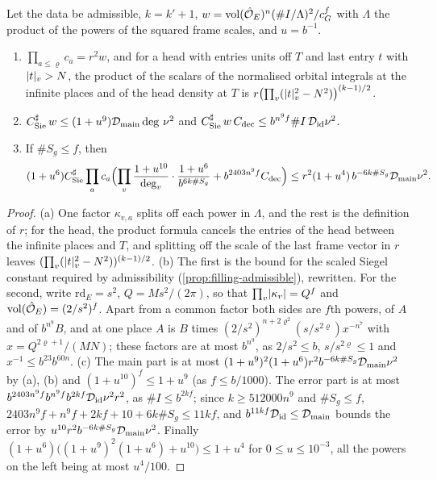 \begin{lemma}\label{lem:main-constants}
Let the data be admissible, $k=k'+1$, $w=\operatorname{vol}(\hat{\mathcal{O}}_E)^n(\#I/\Lambda)^2/c_G^f$ with $\Lambda$ the product of the powers of the squared frame scales, and $u=b^{-1}$.
\begin{enumerate}[label=\textup{(\alph*)}]
\item $\prod_{a\le\varrho}c_a=r^2w$, and for a head with entries units off $T$ and last entry $t$ with $\lvert t\rvert_v>N$, the product of the scalars of the normalised orbital integrals at the infinite places and of the head
density at $T$ is $r\bigl(\prod_v(\lvert t\rvert_v^2-N^2)\bigr)^{(k-1)/2}$.
\item $C^\sharp_{\rm Sie}\,w\le(1+u^9)\mathcal D_{\rm main}\deg\,\nu^2$ and $C^\sharp_{\rm Sie}\,w\,C_{\rm dec}\le b^{n^9f}\#I\,\mathcal D_{\rm id}\nu^2$.
\item If $\#S_g\le f$, then
\[
  (1+u^6)C^\sharp_{\rm Sie}\prod_ac_a\Bigl(\prod_v\frac{1+u^{10}}{\deg_v}\cdot\frac{1+u^6}{b^{6k\#S_g}}+b^{2403n^9f}C_{\rm dec}\Bigr)\le r^2(1+u^4)\,b^{-6k\#S_g}\mathcal D_{\rm main}\nu^2.
\]
\end{enumerate}
\end{lemma}

\begin{proof}
(a) One factor $\kappa_{v,a}$ splits off each power in $\Lambda$, and the rest is the definition of $r$; for the head, the product formula cancels the entries of the head between the infinite places and $T$, and splitting off the
scale of the last frame vector in $r$ leaves $(\prod_v(\lvert t\rvert_v^2-N^2))^{(k-1)/2}$. (b) The first is the bound for the scaled Siegel constant required by admissibility (\cref{prop:filling-admissible}), rewritten. For the second,
write $\mathrm{rd}_E=s^2$, $Q=Ms^2/(2\pi)$, so that $\prod_v\lvert \kappa_v\rvert=Q^f$ and $\operatorname{vol}(\hat{\mathcal{O}}_E)=(2/s^2)^f$. Apart from a common factor both sides are $f$th powers, of $A$ and of $b^{n^9}B$, and at one place $A$ is $B$ times
$(2/s^2)^{n+2\varrho^2}(s/s^{2\varrho})x^{-n^7}$ with $x=Q^{2\varrho+1}/(MN)$; these factors are at most $b^{n^9}$, as $2/s^2\le b$, $s/s^{2\varrho}\le1$ and $x^{-1}\le b^{23}b^{60n}$.
(c) The main part is at most $(1+u^9)^2(1+u^6)r^2b^{-6k\#S_g}\mathcal D_{\rm main}\nu^2$ by (a), (b) and $(1+u^{10})^f\le1+u^9$ (as $f\le b/1000$). The error part is at most $b^{2403n^9f}b^{n^9f}b^{2kf}\mathcal D_{\rm id}\nu^2r^2$, as $\#I\le b^{2kf}$;
since $k\ge512000n^9$ and $\#S_g\le f$, $2403n^9f+n^9f+2kf+10+6k\#S_g\le11kf$, and $b^{11kf}\mathcal D_{\rm id}\le\mathcal D_{\rm main}$ bounds the error by $u^{10}r^2b^{-6k\#S_g}\mathcal D_{\rm main}\nu^2$. Finally
$(1+u^6)\bigl((1+u^9)^2(1+u^6)+u^{10}\bigr)\le1+u^4$ for $0\le u\le10^{-3}$, all the powers on the left being at most $u^4/100$.
\end{proof}

